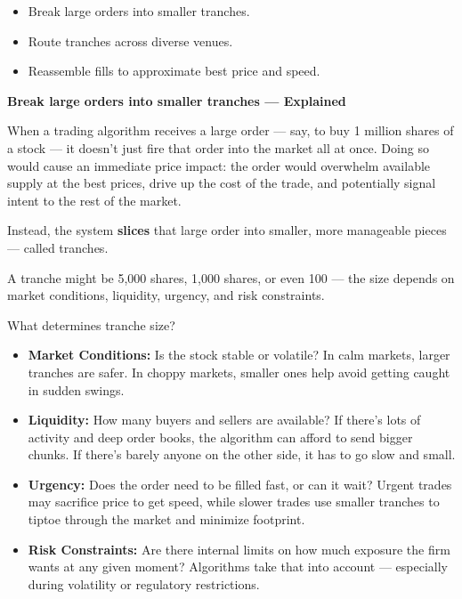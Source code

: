 \begin{itemize}
  \item Break large orders into smaller tranches.
  \item Route tranches across diverse venues.
  \item Reassemble fills to approximate best price and speed.
\end{itemize}

\textbf{Break large orders into smaller tranches — Explained}

When a trading algorithm receives a large order — say, to buy 1 million shares of a stock — it doesn’t just fire 
that order into the market all at once. Doing so would cause an immediate price impact: the order would overwhelm 
available supply at the best prices, drive up the cost of the trade, and potentially signal intent to the rest 
of the market.

Instead, the system \textbf{slices} that large order into smaller, more manageable pieces — called tranches.

A tranche might be 5,000 shares, 1,000 shares, or even 100 — the size depends on market conditions, liquidity, 
urgency, and risk constraints.

What determines tranche size?

\begin{itemize}
  \item \textbf{Market Conditions:} Is the stock stable or volatile? In calm markets, larger tranches are safer. 
  In choppy markets, smaller ones help avoid getting caught in sudden swings.

  \item \textbf{Liquidity:} How many buyers and sellers are available? If there’s lots of activity and deep 
  order books, the algorithm can afford to send bigger chunks. If there’s barely anyone on the other side, 
  it has to go slow and small.

  \item \textbf{Urgency:} Does the order need to be filled fast, or can it wait? Urgent trades may sacrifice 
  price to get speed, while slower trades use smaller tranches to tiptoe through the market and minimize footprint.

  \item \textbf{Risk Constraints:} Are there internal limits on how much exposure the firm wants at any given 
  moment? Algorithms take that into account — especially during volatility or regulatory restrictions.

\end{itemize}

